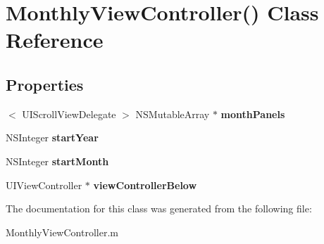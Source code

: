 \hypertarget{interface_monthly_view_controller_07_08}{\section{\-Monthly\-View\-Controller() \-Class \-Reference}
\label{interface_monthly_view_controller_07_08}
}
\subsection*{\-Properties}
\begin{DoxyCompactItemize}
\item 
\hypertarget{interface_monthly_view_controller_07_08_a8d1b2a9fa3918a7c65dfe99c68552409}{$<$ \-U\-I\-Scroll\-View\-Delegate $>$\*
 \-N\-S\-Mutable\-Array $\ast$ {\bfseries month\-Panels}}\label{interface_monthly_view_controller_07_08_a8d1b2a9fa3918a7c65dfe99c68552409}

\item 
\hypertarget{interface_monthly_view_controller_07_08_abd36b5c72f155b22fd082cba3c75e2bd}{\-N\-S\-Integer {\bfseries start\-Year}}\label{interface_monthly_view_controller_07_08_abd36b5c72f155b22fd082cba3c75e2bd}

\item 
\hypertarget{interface_monthly_view_controller_07_08_a0190a119f27192e34cda256d2c560303}{\-N\-S\-Integer {\bfseries start\-Month}}\label{interface_monthly_view_controller_07_08_a0190a119f27192e34cda256d2c560303}

\item 
\hypertarget{interface_monthly_view_controller_07_08_a2dd242ed5b0194094c6cb1f4e48f545f}{\-U\-I\-View\-Controller $\ast$ {\bfseries view\-Controller\-Below}}\label{interface_monthly_view_controller_07_08_a2dd242ed5b0194094c6cb1f4e48f545f}

\end{DoxyCompactItemize}


\-The documentation for this class was generated from the following file\-:\begin{DoxyCompactItemize}
\item 
\-Monthly\-View\-Controller.\-m\end{DoxyCompactItemize}
